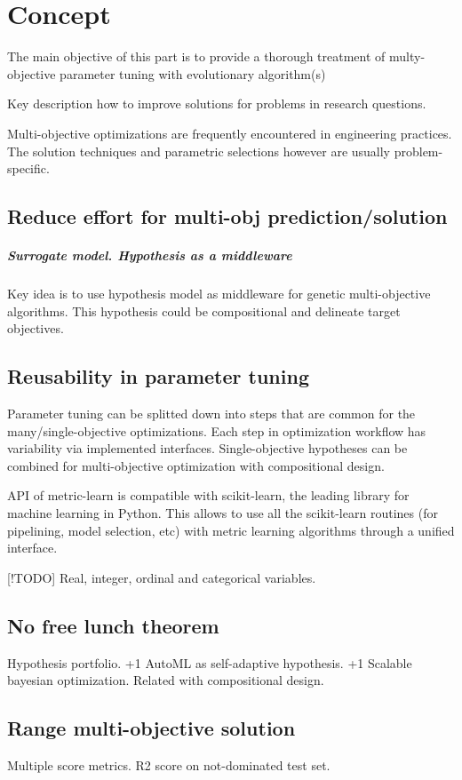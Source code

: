 \chapter{Concept}
The main objective of this part is to provide a thorough treatment of multy-objective parameter tuning with evolutionary algorithm(s)


Key description how to improve solutions for problems in research questions.

Multi-objective optimizations are frequently encountered in
engineering practices. The solution techniques and parametric
selections however are usually problem-specific. \cite{DBLP:journals/corr/abs-1812-07958}

    \section{Reduce effort for multi-obj prediction/solution}
        \paragraph{Surrogate model. Hypothesis as a middleware}
        Key idea is to use hypothesis model as middleware for genetic multi-objective algorithms.
        This hypothesis could be compositional and delineate target objectives. 

    \section{Reusability in parameter tuning}
        Parameter tuning can be splitted down into steps that are common for the many/single-objective optimizations. 
        Each step in optimization workflow has variability via implemented interfaces.
        Single-objective hypotheses can be combined for multi-objective optimization with compositional design.

        API of metric-learn is compatible with scikit-learn, the leading library for machine learning in Python. 
        This allows to use all the scikit-learn routines (for pipelining, model selection, etc) with metric learning algorithms through a unified interface.

        [!TODO] Real, integer, ordinal and categorical variables.

    \section{No free lunch theorem}
        Hypothesis portfolio. +1 AutoML as self-adaptive hypothesis. +1 Scalable bayesian optimization. Related with compositional design.

    \section{Range multi-objective solution}
        Multiple score metrics. R2 score on not-dominated test set.

